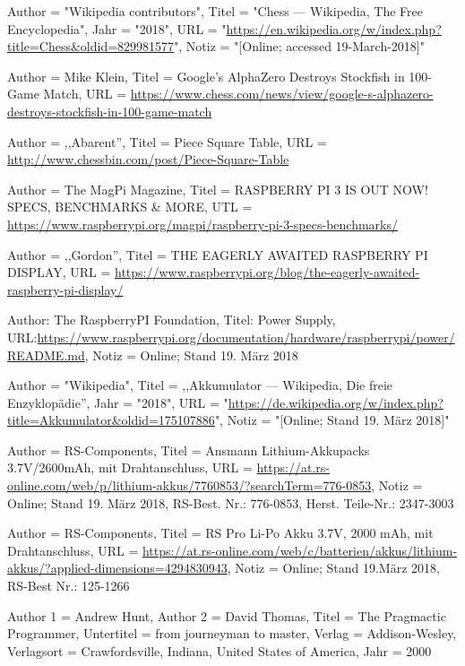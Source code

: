 \documentclass[12pt,a4paper]{article}
\begin{document}
\begingroup
\renewcommand{\section}[2]{}
\begin{thebibliography}{}
    Author = "Wikipedia contributors",
    Titel = "Chess --- Wikipedia{,} The Free Encyclopedia",
    Jahr = "2018",
    URL = "\url{https://en.wikipedia.org/w/index.php?title=Chess&oldid=829981577}",
    Notiz = "[Online; accessed 19-March-2018]"
    
    	Author = Mike Klein, Titel = Google's AlphaZero Destroys Stockfish in 100-Game Match, 
    	URL = \url{https://www.chess.com/news/view/google-s-alphazero-destroys-stockfish-in-100-game-match}
	
	Author = ,,Abarent'', Titel = Piece Square Table, URL = \url{http://www.chessbin.com/post/Piece-Square-Table}    	
	
	Author = The MagPi Magazine, Titel = RASPBERRY PI 3 IS OUT NOW! SPECS, BENCHMARKS \& MORE, 
	UTL = \url{https://www.raspberrypi.org/magpi/raspberry-pi-3-specs-benchmarks/}
	
	Author = ,,Gordon'', Titel = THE EAGERLY AWAITED RASPBERRY PI DISPLAY, 
	URL = \url{https://www.raspberrypi.org/blog/the-eagerly-awaited-raspberry-pi-display/}
    	
		Author: The RaspberryPI Foundation, Titel: Power Supply,
		URL:\url{https://www.raspberrypi.org/documentation/hardware/raspberrypi/power/README.md},
		Notiz = Online; Stand 19. März 2018
		
	 Author = "Wikipedia",
   Titel = ,,Akkumulator --- Wikipedia{,} Die freie Enzyklopädie'',
   Jahr = "2018",
   URL = "\url{https://de.wikipedia.org/w/index.php?title=Akkumulator&oldid=175107886}",
   Notiz = "[Online; Stand 19. März 2018]"
   
   Author = RS-Components,
   Titel = Ansmann Lithium-Akkupacks 3.7V/2600mAh, mit Drahtanschluss,
   URL = \url{https://at.rs-online.com/web/p/lithium-akkus/7760853/?searchTerm=776-0853},
	Notiz = Online; Stand 19. März 2018,
	RS-Best. Nr.: 776-0853,
	Herst. Teile-Nr.: 2347-3003
	
	Author = RS-Components,
	Titel = RS Pro Li-Po Akku 3.7V, 2000 mAh, mit Drahtanschluss,
	URL = \url{https://at.rs-online.com/web/c/batterien/akkus/lithium-akkus/?applied-dimensions=4294830943},
	Notiz = Online; Stand 19.März 2018,
	RS-Best Nr.: 125-1266
	
	Author 1 = Andrew Hunt, Author 2 = David Thomas,
	Titel = The Pragmactic Programmer, Untertitel = from journeyman to master,
	Verlag = Addison-Wesley, Verlagsort = Crawfordsville, Indiana, United States of America, 
	Jahr = 2000

	
\end{thebibliography}
\endgroup
\end{document}
